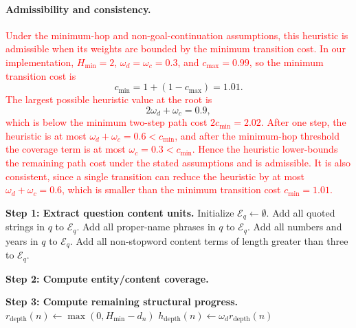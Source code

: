 \documentclass[11pt]{article}
\begin{document}
{\paragraph{Admissibility and consistency.}
\textcolor{red}{Under the minimum-hop and non-goal-continuation assumptions, this}
\textcolor{red}{heuristic is admissible when its weights are bounded by the minimum}
\textcolor{red}{transition cost. In our implementation, \(H_{\min}=2\),}
\textcolor{red}{\(\omega_d=\omega_c=0.3\), and \(c_{\max}=0.99\), so the minimum}
\textcolor{red}{transition cost is}
\[
c_{\min}=1+(1-c_{\max})=1.01.
\]
\textcolor{red}{The largest possible heuristic value at the root is}
\[
2\omega_d+\omega_c=0.9,
\]
\textcolor{red}{which is below the minimum two-step path cost \(2c_{\min}=2.02\). After}
\textcolor{red}{one step, the heuristic is at most \(\omega_d+\omega_c=0.6<c_{\min}\),}
\textcolor{red}{and after the minimum-hop threshold the coverage term is at most}
\textcolor{red}{\(\omega_c=0.3<c_{\min}\). Hence the heuristic lower-bounds the remaining}
\textcolor{red}{path cost under the stated assumptions and is admissible. It is also}
\textcolor{red}{consistent, since a single transition can reduce the heuristic by at most}
\textcolor{red}{\(\omega_d+\omega_c=0.6\), which is smaller than the minimum transition}
\textcolor{red}{cost \(c_{\min}=1.01\).}

\begin{algorithm}[t]
\caption{Dataset-Agnostic Symbolic Progress Heuristic}
\label{alg:symbolic-progress-heuristic}

\BlankLine
\textbf{Step 1: Extract question content units.}\;
Initialize \(\mathcal{E}_q \leftarrow \emptyset\).\;
Add all quoted strings in \(q\) to \(\mathcal{E}_q\).\;
Add all proper-name phrases in \(q\) to \(\mathcal{E}_q\).\;
Add all numbers and years in \(q\) to \(\mathcal{E}_q\).\;
Add all non-stopword content terms of length greater than three to \(\mathcal{E}_q\).\;

\BlankLine
\textbf{Step 2: Compute entity/content coverage.}\;

\BlankLine
\textbf{Step 3: Compute remaining structural progress.}\;
\(r_{\mathrm{depth}}(n) \leftarrow \max(0,H_{\min}-d_n)\)\;
\(h_{\mathrm{depth}}(n) \leftarrow \omega_d r_{\mathrm{depth}}(n)\)\;


\end{algorithm}}
\end{document}

